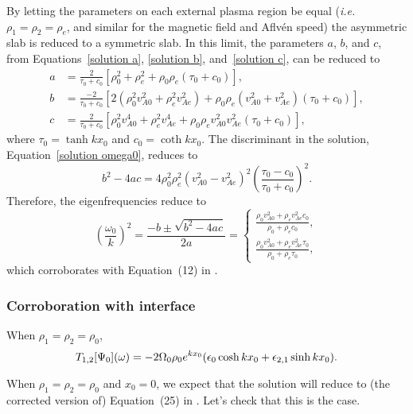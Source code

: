 \documentclass[12pt, draft]{../style-files/ociamthesis}
\begin{document}
By letting the parameters on each external plasma region be equal (\textit{i.e.} $\rho_1 = \rho_2 = \rho_e$, and similar for the magnetic field and Aflv\'{e}n speed) the asymmetric slab is reduced to a symmetric slab. In this limit, the parameters $a$, $b$, and $c$, from Equations~\eqref{solution a}, \eqref{solution b}, and~\eqref{solution c}, can be reduced to
\begin{align}
a &= \frac{2}{\tau_0 + c_0} \left[ \rho_0^2 + \rho_e^2 + \rho_0\rho_e(\tau_0 + c_0) \right], \\
b &= \frac{-2}{\tau_0 + c_0} \left[ 2(\rho_0^2v_{A0}^2 + \rho_e^2v_{Ae}^2) + \rho_0\rho_e(v_{A0}^2 + v_{Ae}^2)(\tau_0 + c_0) \right], \\
c &= \frac{2}{\tau_0 + c_0} \left[ \rho_0^2v_{A0}^4 + \rho_e^2v_{Ae}^4 + \rho_0\rho_ev_{A0}^2v_{Ae}^2(\tau_0 + c_0) \right],
\end{align}
where $\tau_0 = \tanh{kx_0}$ and $c_0 = \coth{kx_0}$. The discriminant in the solution, Equation~\eqref{solution omega0}, reduces to
\begin{equation}
b^2 - 4ac = 4\rho_0^2\rho_e^2(v_{A0}^2 - v_{Ae}^2)^2 \left(\frac{\tau_0 - c_0}{\tau_0 + c_0}\right)^2. 
\end{equation}
Therefore, the eigenfrequencies reduce to
\begin{equation}
\left(\frac{\omega_0}{k}\right)^2 = \frac{-b \pm \sqrt{b^2 - 4ac}}{2a} =
\begin{cases}
\frac{\rho_0v_{A0}^2 + \rho_ev_{Ae}^2c_0}{\rho_0 + \rho_ec_0}, \\
\frac{\rho_0v_{A0}^2 + \rho_ev_{Ae}^2\tau_0}{\rho_0 + \rho_e\tau_0},
\end{cases}
\end{equation}
which corroborates with Equation~(12) in \cite{rob81b}.


\subsubsection{Corroboration with interface}
When $\rho_1 = \rho_2 = \rho_0$,
\begin{equation}
T_{1,2}[\Psi_0](\omega) = -2\Omega_0\rho_0 e^{kx_0} (\epsilon_0 \cosh{kx_0} + \epsilon_{2,1}\sinh{kx_0}).
\end{equation}

When $\rho_1 = \rho_2 = \rho_0$ and $x_0 = 0$, we expect that the solution will reduce to (the corrected version of) Equation~(25) in \cite{rae_etal81}. Let's check that this is the case.
\end{document}
